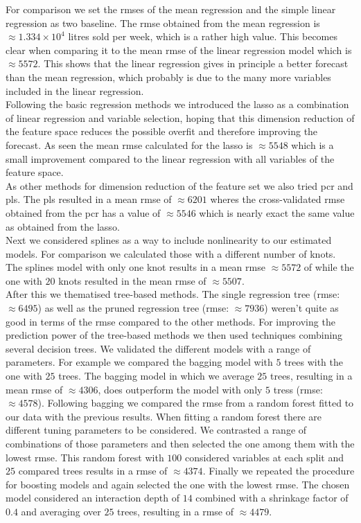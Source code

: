 \documentclass[11pt,]{article}
\begin{document}
For comparison we set the \ac{rmse}s of the mean regression and the
simple linear regression as two baseline. The \ac{rmse} obtained from
the mean regression is \(\approx \ensuremath{1.334\times 10^{4}}\)
litres sold per week, which is a rather high value. This becomes clear
when comparing it to the mean \ac{rmse} of the linear regression model
which is \(\approx 5572\). This shows that the linear regression gives
in principle a better forecast than the mean regression, which probably
is due to the many more variables included in the linear regression.\\
Following the basic regression methods we introduced the \ac{lasso} as a
combination of linear regression and variable selection, hoping that
this dimension reduction of the feature space reduces the possible
overfit and therefore improving the forecast. As seen the mean \ac{rmse}
calculated for the lasso is \(\approx 5548\) which is a small
improvement compared to the linear regression with all variables of the
feature space.\\
As other methods for dimension reduction of the feature set we also
tried \ac{pcr} and \ac{pls}. The \ac{pls} resulted in a mean \ac{rmse}
of \(\approx 6201\) wheres the cross-validated \ac{rmse} obtained from
the \ac{pcr} has a value of \(\approx 5546\) which is nearly exact the
same value as obtained from the \ac{lasso}.\\
Next we considered splines as a way to include nonlinearity to our
estimated models. For comparison we calculated those with a different
number of knots. The splines model with only one knot results in a mean
rmse \(\approx 5572\) of while the one with \(20\) knots resulted in the
mean rmse of \(\approx 5507\).\\
After this we thematised tree-based methods. The single regression tree
(\ac{rmse}: \(\approx 6495\)) as well as the pruned regression tree
(\ac{rmse}: \(\approx 7936\)) weren't quite as good in terms of the
\ac{rmse} compared to the other methods. For improving the prediction
power of the tree-based methods we then used techniques combining
several decision trees. We validated the different models with a range
of parameters. For example we compared the bagging model with \(5\)
trees with the one with \(25\) trees. The bagging model in which we
average \(25\) trees, resulting in a mean \ac{rmse} of \(\approx 4306\),
does outperform the model with only \(5\) tress (\ac{rmse}:
\(\approx 4578\)). Following bagging we compared the \ac{rmse} from a
random forest fitted to our data with the previous results. When fitting
a random forest there are different tuning parameters to be considered.
We contrasted a range of combinations of those parameters and then
selected the one among them with the lowest \ac{rmse}. This random
forest with \(100\) considered variables at each split and \(25\)
compared trees results in a \ac{rmse} of \(\approx 4374\). Finally we
repeated the procedure for boosting models and again selected the one
with the lowest \ac{rmse}. The chosen model considered an interaction
depth of \(14\) combined with a shrinkage factor of \(0.4\) and
averaging over \(25\) trees, resulting in a \ac{rmse} of
\(\approx 4479\).
\end{document}
